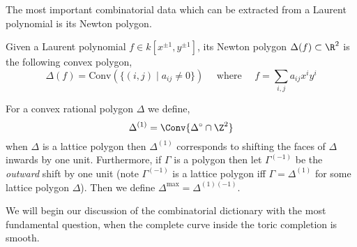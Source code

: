 \documentclass[12pt]{article}
\begin{document}
\noindent
The most important combinatorial data which can be extracted from a Laurent polynomial is its Newton polygon.


\begin{defn}
Given a Laurent polynomial $f \in k[x^{\pm 1}, y^{\pm 1}]$, its Newton polygon $\Delta(f) \subset \R^2$ is the following convex polygon,
\begin{equation}
\Delta(f) = \mathrm{Conv} \left( \{ (i,j) \mid a_{ij} \neq 0 \} \right) \quad \text{ where } \quad f = \sum_{i,j} a_{ij} x^i y^i 
\end{equation}
\end{defn}

\begin{defn}
For a convex rational polygon $\Delta$ we define,
\[ \Delta^{(1)} = \Conv{\Delta^\circ \cap \Z^2} \]
when $\Delta$ is a lattice polygon then $\Delta^{(1)}$ corresponds to shifting the faces of $\Delta$ inwards by one unit. Furthermore, if $\Gamma$ is a polygon then let $\Gamma^{(-1)}$ be the \textit{outward} shift by one unit (note $\Gamma^{(-1)}$ is a lattice polygon iff $\Gamma = \Delta^{(1)}$ for some lattice polygon $\Delta$). Then we define $\Delta^{\text{max}} = \Delta^{(1)(-1)}$.
\end{defn}

\noindent
We will begin our discussion of the combinatorial dictionary with the most fundamental question, when the complete curve inside the toric completion is smooth. 
\end{document}

